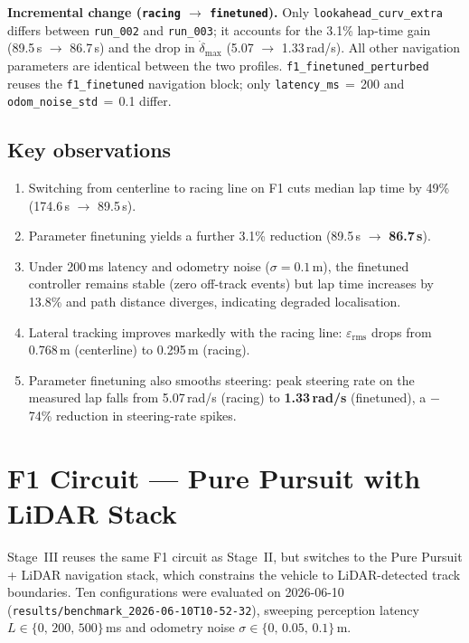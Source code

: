 \documentclass[11pt,a4paper]{article}
\newcommand{\runref}[1]{\texttt{results/#1}}
\newcommand{\best}[1]{\textbf{#1}}
\newcommand{\cfg}[1]{\texttt{\small #1}}
\begin{document}
\noindent\textbf{Incremental change (\cfg{racing} $\rightarrow$ \cfg{finetuned}).}
Only \texttt{lookahead\_curv\_extra} differs between \texttt{run\_002} and
\texttt{run\_003}; it accounts for the 3.1\% lap-time gain
(89.5\,s $\rightarrow$ 86.7\,s) and the drop in $\dot{\delta}_{\max}$
(5.07 $\rightarrow$ 1.33\,rad/s).
All other navigation parameters are identical between the two profiles.
\cfg{f1\_finetuned\_perturbed} reuses the \cfg{f1\_finetuned} navigation
block; only \texttt{latency\_ms}\,$=$\,200 and
\texttt{odom\_noise\_std}\,$=$\,0.1 differ.

\subsection{Key observations}
\begin{enumerate}[nosep]
  \item Switching from centerline to racing line on F1 cuts median lap time by
        49\% (174.6\,s $\rightarrow$ 89.5\,s).
  \item Parameter finetuning yields a further 3.1\% reduction
        (89.5\,s $\rightarrow$ \best{86.7\,s}).
  \item Under 200\,ms latency and odometry noise
        ($\sigma = 0.1$\,m), the finetuned controller remains stable (zero off-track
        events) but lap time increases by 13.8\% and path distance
        diverges, indicating degraded localisation.
  \item Lateral tracking improves markedly with the racing line:
        $\varepsilon_{\mathrm{rms}}$ drops from 0.768\,m (centerline) to
        0.295\,m (racing).
  \item Parameter finetuning also smooths steering: peak steering rate on the
        measured lap falls from 5.07\,rad/s (racing) to \best{1.33\,rad/s}
        (finetuned), a $-$74\% reduction in steering-rate spikes.
\end{enumerate}

\section{F1 Circuit --- Pure Pursuit with LiDAR Stack}
\label{sec:f1-lidar}

Stage~III reuses the same F1 circuit as Stage~II, but switches to the
Pure Pursuit + LiDAR navigation stack, which constrains the vehicle to
LiDAR-detected track boundaries.
Ten configurations were evaluated on 2026-06-10
(\runref{benchmark\_2026-06-10T10-52-32}), sweeping perception latency
$L \in \{0,\,200,\,500\}$\,ms and odometry noise
$\sigma \in \{0,\,0.05,\,0.1\}$\,m.
\end{document}
